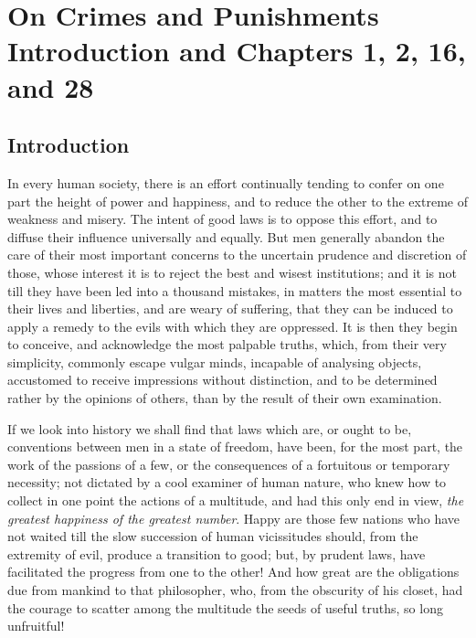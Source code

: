 
\author{Cesare Beccaria}
\chapter[Cesare Beccaria -- On Crimes and Punishments, excerpt]{On
Crimes and Punishments\\\smaller Introduction and Chapters 1, 2, 16,
and 28}


\section*{Introduction}

In every human society, there is an effort continually tending to
confer on one part the height of power and happiness, and to reduce
the other to the extreme of weakness and misery. The intent of good
laws is to oppose this effort, and to diffuse their influence
universally and equally. But men generally abandon the care of their
most important concerns to the uncertain prudence and discretion of
those, whose interest it is to reject the best and wisest
institutions; and it is not till they have been led into a thousand
mistakes, in matters the most essential to their lives and liberties,
and are weary of suffering, that they can be induced to apply a remedy
to the evils with which  they are oppressed. It is then they
begin to conceive, and acknowledge the most palpable truths, which,
from their very simplicity, commonly escape vulgar minds, incapable of
analysing objects, accustomed to receive impressions without
distinction, and to be determined rather by the opinions of others,
than by the result of their own examination.

If we look into history we shall find that laws which are, or ought to
be, conventions between men in a state of freedom, have been, for the
most part, the work of the passions of a few, or the consequences of a
fortuitous or temporary necessity; not dictated by a cool examiner of
human nature, who knew how to collect in one point the actions of a
multitude, and had this only end in view, \textit{the greatest
happiness of the greatest number}. Happy are those few nations who
have not waited till the slow succession of human vicissitudes should,
from the extremity of evil, produce a transition to good; but, by
prudent laws, have facilitated the progress from one to the other! And
how great are the obligations due from mankind to that philosopher,
who, from the obscurity of his closet, had the courage to scatter
among the multitude the seeds of useful truths, so long unfruitful!

